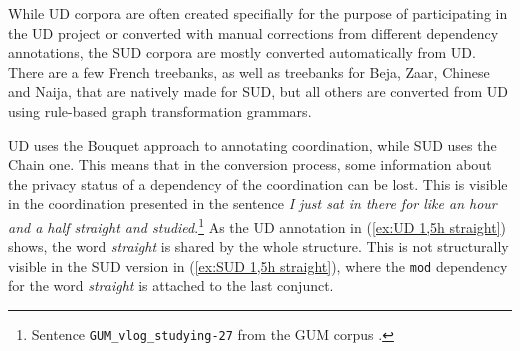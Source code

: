 While UD corpora are often created specifially for the purpose of participating in the UD project or converted with manual corrections from different dependency annotations, the SUD corpora are mostly converted automatically from UD. There are a few French treebanks, as well as treebanks for Beja, Zaar, Chinese and Naija, that are natively made for SUD, but all others are converted from UD using rule-based graph transformation grammars. 

UD uses the Bouquet approach to annotating coordination, while SUD uses the Chain one. This means that in the conversion process, some information about the privacy status of a dependency of the coordination can be lost. This is visible in the coordination presented in the sentence \textsl{I just sat in there for like an hour and a half straight and studied}.\footnote{Sentence \texttt{GUM\_vlog\_studying-27} from the GUM corpus \citep{Zeldes2017}.} As the UD annotation in (\ref{ex:UD 1,5h straight}) shows, the word \textsl{straight} is shared by the whole structure. This is not structurally visible in the SUD version in (\ref{ex:SUD 1,5h straight}), where the \texttt{mod} dependency for the word \textsl{straight} is attached to the last conjunct. 

